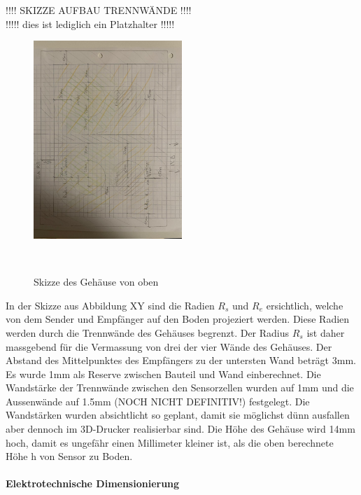\documentclass{article}
\begin{document}
!!!! SKIZZE AUFBAU TRENNWÄNDE !!!!\\
!!!!! dies ist lediglich ein Platzhalter !!!!!
\begin{figure}[H]
    \centering
    \includegraphics[width=0.5\textwidth]{Skizze_Gehause_oben.pdf}
    \caption{Skizze des Gehäuse von oben}~\label{fig:Skizze_Gehause}
\end{figure}

In der Skizze aus Abbildung XY sind die Radien \(R_s\) und \(R_e\) ersichtlich, welche 
von dem Sender und Empfänger auf den Boden projeziert werden. Diese Radien werden durch 
die Trennwände des Gehäuses begrenzt. Der Radius \(R_s\) ist daher massgebend für die 
Vermassung von drei der vier Wände des Gehäuses. Der Abstand des Mittelpunktes des 
Empfängers zu der untersten Wand beträgt 3mm. Es wurde 1mm als Reserve zwischen 
Bauteil und Wand einberechnet. Die Wandstärke der Trennwände zwischen den Sensorzellen
wurden auf 1mm und die Aussenwände auf 1.5mm (NOCH NICHT DEFINITIV!) festgelegt. 
Die Wandstärken wurden absichtlicht so geplant, damit sie möglichst dünn ausfallen 
aber dennoch im 3D-Drucker realisierbar sind. Die Höhe des Gehäuse wird 14mm hoch, 
damit es ungefähr einen Millimeter kleiner ist, als die oben berechnete Höhe h von 
Sensor zu Boden.



\paragraph{Elektrotechnische Dimensionierung}
\end{document}
